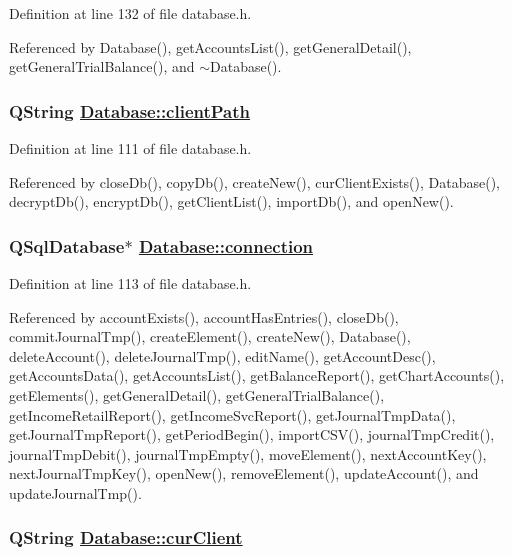 Definition at line 132 of file database.h.

Referenced by Database(), get\-Accounts\-List(), get\-General\-Detail(), get\-General\-Trial\-Balance(), and $\sim$Database().\hypertarget{classDatabase_r1}{
\subsubsection[clientPath]{\setlength{\rightskip}{0pt plus 5cm}QString \hyperlink{classDatabase_r1}{Database::client\-Path}}}
\label{classDatabase_r1}


Definition at line 111 of file database.h.

Referenced by close\-Db(), copy\-Db(), create\-New(), cur\-Client\-Exists(), Database(), decrypt\-Db(), encrypt\-Db(), get\-Client\-List(), import\-Db(), and open\-New().\hypertarget{classDatabase_r2}{
\subsubsection[connection]{\setlength{\rightskip}{0pt plus 5cm}QSql\-Database$\ast$ \hyperlink{classDatabase_r2}{Database::connection}}}
\label{classDatabase_r2}


Definition at line 113 of file database.h.

Referenced by account\-Exists(), account\-Has\-Entries(), close\-Db(), commit\-Journal\-Tmp(), create\-Element(), create\-New(), Database(), delete\-Account(), delete\-Journal\-Tmp(), edit\-Name(), get\-Account\-Desc(), get\-Accounts\-Data(), get\-Accounts\-List(), get\-Balance\-Report(), get\-Chart\-Accounts(), get\-Elements(), get\-General\-Detail(), get\-General\-Trial\-Balance(), get\-Income\-Retail\-Report(), get\-Income\-Svc\-Report(), get\-Journal\-Tmp\-Data(), get\-Journal\-Tmp\-Report(), get\-Period\-Begin(), import\-CSV(), journal\-Tmp\-Credit(), journal\-Tmp\-Debit(), journal\-Tmp\-Empty(), move\-Element(), next\-Account\-Key(), next\-Journal\-Tmp\-Key(), open\-New(), remove\-Element(), update\-Account(), and update\-Journal\-Tmp().\hypertarget{classDatabase_r3}{
\subsubsection[curClient]{\setlength{\rightskip}{0pt plus 5cm}QString \hyperlink{classDatabase_r3}{Database::cur\-Client}}}
\label{classDatabase_r3}


